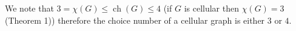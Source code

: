 \documentclass[letterpaper, 10 pt, conference]{ieeeconf}  %
\DeclareMathOperator*{\ch}{ch}
\begin{document}
We note that $3=\chi(G) \leqslant \ch(G) \leqslant 4$ (if $G$ is cellular then $\chi(G) = 3$ \cite{662943} (Theorem 1)) therefore the choice number of a cellular graph is either $3$ or $4$.
\addtolength{\textheight}{-12cm}   %




\end{document}
